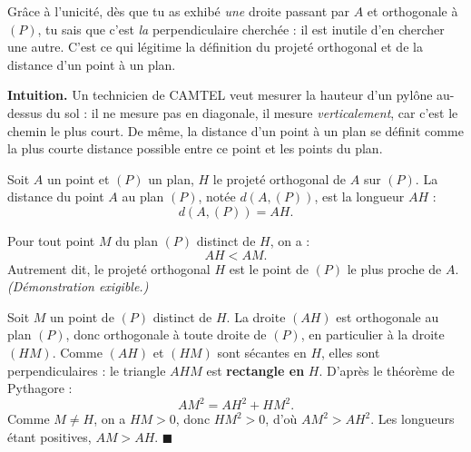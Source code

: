 \documentclass[11pt]{article}
\newcommand{\cle}[1]{{\popxbold\color{popdark}#1}}
\newcounter{popsec}
\newcounter{popsub}
\newcommand{\courssub}[1]{%
  \stepcounter{popsub}%
  \par\vspace{9pt}\noindent{\popxbold\fontsize{11.5}{13}\selectfont\color{popink}{\color{poporange}\thepopsec.\thepopsub}\hspace{6pt}#1}\par\nopagebreak\vspace{4pt}
}
\begin{document}
\begin{aretenir}
Grâce à l'unicité, dès que tu as exhibé \emph{une} droite passant par $A$ et orthogonale à $(P)$, tu sais que c'est \emph{la} perpendiculaire cherchée : il est inutile d'en chercher une autre. C'est ce qui légitime la définition du projeté orthogonal et de la distance d'un point à un plan.
\end{aretenir}

\courssub{Distance d'un point à un plan}

\textbf{Intuition.} Un technicien de CAMTEL veut mesurer la hauteur d'un pylône au-dessus du sol : il ne mesure pas en diagonale, il mesure \emph{verticalement}, car c'est le chemin le plus court. De même, la distance d'un point à un plan se définit comme la plus courte distance possible entre ce point et les points du plan.

\begin{definition}
Soit $A$ un point et $(P)$ un plan, $H$ le projeté orthogonal de $A$ sur $(P)$. La \cle{distance} du point $A$ au plan $(P)$, notée $d(A, (P))$, est la longueur $AH$ :
\[ d(A, (P)) = AH. \]
\end{definition}

\begin{propriete}
Pour tout point $M$ du plan $(P)$ distinct de $H$, on a :
\[ AH < AM. \]
Autrement dit, le projeté orthogonal $H$ est le point de $(P)$ le plus proche de $A$. \emph{(Démonstration exigible.)}
\end{propriete}

\begin{experience}
Soit $M$ un point de $(P)$ distinct de $H$. La droite $(AH)$ est orthogonale au plan $(P)$, donc orthogonale à toute droite de $(P)$, en particulier à la droite $(HM)$. Comme $(AH)$ et $(HM)$ sont sécantes en $H$, elles sont perpendiculaires : le triangle $AHM$ est \textbf{rectangle en} $H$. D'après le théorème de Pythagore :
\[ AM^2 = AH^2 + HM^2. \]
Comme $M \neq H$, on a $HM > 0$, donc $HM^2 > 0$, d'où $AM^2 > AH^2$. Les longueurs étant positives, $AM > AH$. \hfill $\blacksquare$
\end{experience}
\end{document}
